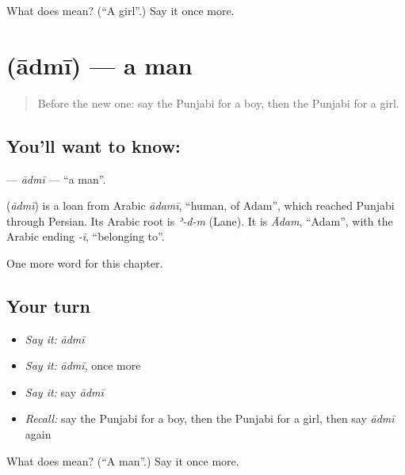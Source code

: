 \begin{tcolorbox}[breakable,colback=teal!4,colframe=teal!35!black,title={Before you move on}]
What does  mean? (\textquotedblleft{}A girl\textquotedblright{}.) Say it once more.
\end{tcolorbox}
\section[\texorpdfstring{\pa{ਆਦਮੀ} (ādmī)}{ਆਦਮੀ (ādmī)}]{ (ādmī) — a man}

\label{lesson:PA-C55-admi}



\begin{quote}
Before the new one: say the Punjabi for a boy, then the Punjabi for a girl.
\end{quote}

\subsection*{You'll want to know: }
\textbf{} — \emph{ādmī} — \textquotedblleft{}a man\textquotedblright{}.

\begin{cousinweb}
\textbf{} (\emph{ādmī}) is a loan from Arabic \emph{ādamī}, \textquotedblleft{}human, of Adam\textquotedblright{}, which reached Punjabi through Persian. Its Arabic root is \emph{ʾ-d-m} (Lane). It is \emph{Ādam}, \textquotedblleft{}Adam\textquotedblright{}, with the Arabic ending \emph{-ī}, \textquotedblleft{}belonging to\textquotedblright{}.
\end{cousinweb}

\begin{grammarlens}[title={What you've built}]
One more word for this chapter.
\end{grammarlens}

\subsection*{Your turn}
\begin{itemize}
\raggedright
  \item \emph{Say it:} \emph{ādmī}
  \item \emph{Say it:} \emph{ādmī}, once more
  \item \emph{Say it:} say \emph{ādmī}
  \item \emph{Recall:} say the Punjabi for a boy, then the Punjabi for a girl, then say \emph{ādmī} again
\end{itemize}

\begin{tcolorbox}[breakable,colback=teal!4,colframe=teal!35!black,title={Before you move on}]
What does  mean? (\textquotedblleft{}A man\textquotedblright{}.) Say it once more.
\end{tcolorbox}

